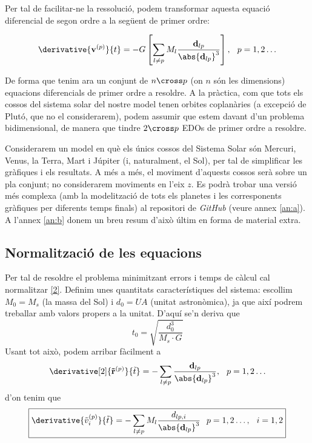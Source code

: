 \documentclass[10pt, twoside, a4paper]{article}
\begin{document}
Per tal de facilitar-ne la ressolució, podem transformar aquesta equació diferencial de segon ordre a la següent de primer ordre:

\begin{equation}
    \derivative{\mathbf{v}^{(p)}}{t} = -G \left[ \sum_{l \neq p} M_l\frac{\mathbf{d}_{lp}}{\abs{\mathbf{d}_{lp}}^3}\right], \hspace{0.25cm} p = 1,2 \ldots \label{2}
\end{equation}

De forma que tenim ara un conjunt de $n \cross p$ (on $n$ són les dimensions) equacions diferencials de primer ordre a resoldre. A la pràctica, com que tots els cossos del sistema solar del nostre model tenen orbites coplanàries (a excepció de Plutó, que no el considerarem), podem assumir que estem davant d'un problema bidimensional, de manera que tindre $2 \cross p$ EDOs de primer ordre a resoldre.

Considerarem un model en què els únics cossos del Sistema Solar són Mercuri, Venus, la Terra, Mart i Júpiter (i, naturalment, el Sol), per tal de simplificar les gràfiques i els resultats. A més a més, el moviment d'aquests cossos serà sobre un pla conjunt; no considerarem moviments en l'eix $z$. Es podrà trobar una versió més complexa (amb la modelització de tots els planetes i les corresponents gràfiques per diferents temps finals) al repositori de \textit{GitHub} (veure annex \ref{an:a}). A l'annex \ref{an:b} donem un breu resum d'això últim en forma de material extra.

\subsection{Normalització de les equacions}
Per tal de resoldre el problema minimitzant errors i temps de càlcul cal normalitzar \eqref{2}. Definim unes quantitats característiques del sistema: escollim $M_0 = M_s$ (la massa del Sol) i $d_0 = UA$ (unitat astronòmica), ja que així podrem treballar amb valors propers a la unitat. D'aquí se'n deriva que
\begin{equation*}
    t_0 = \sqrt{\frac{d_0^3}{M_s \cdot G}}
\end{equation*}
Usant tot això, podem arribar fàcilment a 
\begin{equation}
    \derivative[2]{\mathbf{\tilde{r}}^{(p)}}{\tilde{t}} = - \sum_{l \neq p} \frac{\mathbf{d}_{lp}}{\abs{\mathbf{d}_{lp}}^3}, \hspace{0.25cm} p = 1,2 \ldots
\end{equation}
d'on tenim que
\begin{equation}
    \boxed{\derivative{\tilde{v}_i^{(p)}}{\tilde{t}} = - \sum_{l \neq p} M_l \frac{d_{lp,i}}{\abs{\mathbf{d}_{lp}}^3} \hspace{0.25cm} p = 1,2 \ldots, \hspace{0.25cm} i = 1, 2} \label{eq5}
\end{equation}
\end{document}
